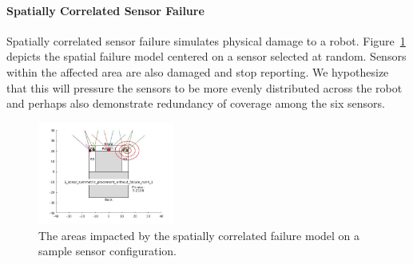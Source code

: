 
\paragraph{Spatially Correlated Sensor Failure}


Spatially correlated sensor failure simulates physical damage to a robot.  
%
Figure~\ref{spatial_failure_model} depicts
the spatial failure model centered on a sensor selected at random.  
%
Sensors within the affected area are also damaged and stop reporting.  
%
We hypothesize that this will pressure the sensors to be more evenly distributed across the robot and perhaps also demonstrate redundancy of coverage among the six sensors.  



\begin{figure}[ht]
	\centering
    \includegraphics[width=0.4\textwidth]{Figures/6_sonar_failure_model.jpg}
    \vspace{-0.15in}
    \caption{The areas impacted by the spatially correlated failure model on a sample sensor configuration.}
    \label{spatial_failure_model}
\end{figure}

